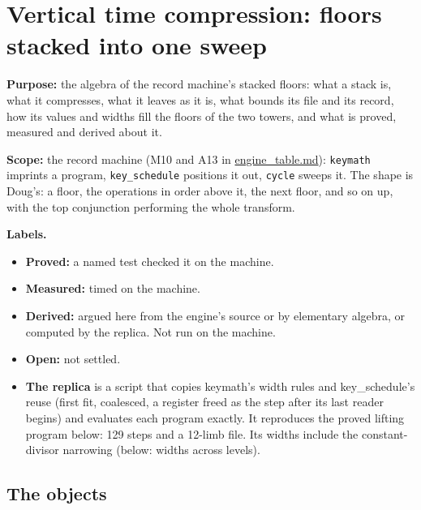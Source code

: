 \chapter{\texorpdfstring{Vertical time compression: floors stacked into one sweep}{Vertical time compression: floors stacked into one sweep}}
\label{chap:vertical-time-compression}

\textbf{Purpose:} the algebra of the record machine's stacked floors: what a stack is, what it compresses, what it leaves as it is, what bounds its file and its record, how its values and widths fill the floors of the two towers, and what is proved, measured and derived about it.

\textbf{Scope:} the record machine (M10 and A13 in \hyperref[chap:engine-table]{engine\_\allowbreak{}table.md}): \texttt{keymath} imprints a program, \texttt{key\_\allowbreak{}schedule} positions it out, \texttt{cycle} sweeps it. The shape is Doug's: a floor, the operations in order above it, the next floor, and so on up, with the top conjunction performing the whole transform.

\textbf{Labels.}

\begin{itemize}
\item \textbf{Proved:} a named test checked it on the machine.
\item \textbf{Measured:} timed on the machine.
\item \textbf{Derived:} argued here from the engine's source or by elementary algebra, or computed by the replica. Not run on the machine.
\item \textbf{Open:} not settled.
\item \textbf{The replica} is a script that copies keymath's width rules and key\_\allowbreak{}schedule's reuse (first fit, coalesced, a register freed as the step after its last reader begins) and evaluates each program exactly. It reproduces the proved lifting program below: 129 steps and a 12-limb file. Its widths include the constant-divisor narrowing (below: widths across levels).
\end{itemize}

\section{\texorpdfstring{The objects}{The objects}}

